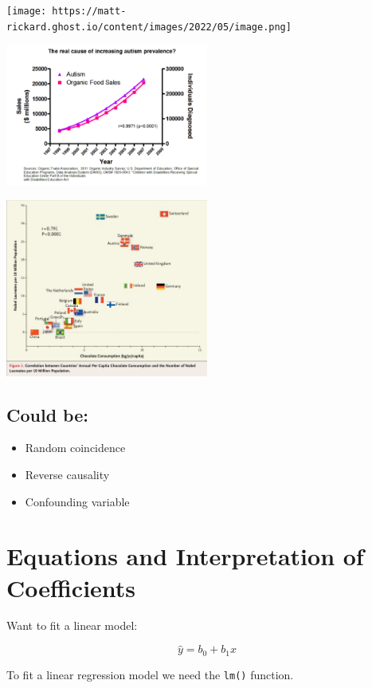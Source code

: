 \documentclass[
  letterpaper,
  DIV=11,
  numbers=noendperiod]{scrartcl}
\begin{document}
\texttt{[image: https://matt-rickard.ghost.io/content/images/2022/05/image.png]}

\includegraphics[width=0.5\textwidth,height=\textheight]{118_M_SLR_Notes_files/mediabag/correlation.png}

\includegraphics[width=0.5\textwidth,height=\textheight]{118_M_SLR_Notes_files/mediabag/TWQaB.jpg}

\hypertarget{could-be}{%
\subsection{Could be:}\label{could-be}}

\begin{itemize}
\item
  Random coincidence
\item
  Reverse causality
\item
  Confounding variable
\end{itemize}

\hypertarget{equations-and-interpretation-of-coefficients}{%
\section{Equations and Interpretation of
Coefficients}\label{equations-and-interpretation-of-coefficients}}

Want to fit a linear model:

\[
\hat{y} = b_0 + b_1x
\]

To fit a linear regression model we need the \texttt{lm()} function.
\end{document}
